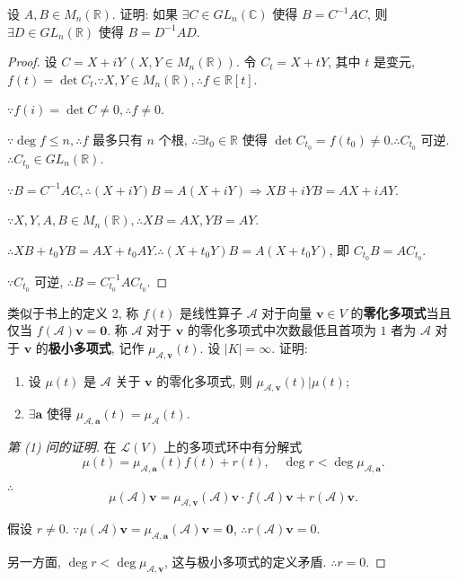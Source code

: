 \documentclass[color=black,device=normal,lang=cn,mode=geye]{elegantnote}
\begin{document}
\begin{exercise}%
    设 $A,B\in M_n(\mathbb{R})$. 证明: 如果 $\exists C\in GL _n(\mathbb{C})$ 使得 $B=C^{-1}AC$, 则 $\exists D\in GL _n(\mathbb{R})$ 使得 $B=D^{-1}AD$.
\end{exercise}
\begin{proof}
    设 $C=X+iY\ (X,Y\in M_n(\mathbb{R}))$. 令 $C_t=X+tY$, 其中 $t$ 是变元, $f(t)=\det C_t.\because X,Y\in M_n(\mathbb{R}),\therefore f\in\mathbb{R}[t]$.
    
    $\because f(i)=\det C\neq0,\therefore f\neq0$.

    $\because\deg f\leq n,\therefore f$ 最多只有 $n$ 个根, $\therefore\exists t_0\in\mathbb{R}$ 使得 $\det C_{t_0}=f(t_0)\neq0.\therefore C_{t_0}$ 可逆. $\therefore C_{t_0}\in GL _n(\mathbb{R})$.

    $\because B=C^{-1}AC,\therefore(X+iY)B=A(X+iY)\Rightarrow XB+iYB=AX+iAY$.

    $\because X,Y,A,B\in M_n(\mathbb{R}),\therefore XB=AX,YB=AY$.

    $\therefore XB+t_0YB=AX+t_0AY.\therefore(X+t_0Y)B=A(X+t_0Y)$, 即 $C_{t_0}B=AC_{t_0}$.

    $\because C_{t_0}$ 可逆, $\therefore B=C_{t_0}^{-1}AC_{t_0}$.
\end{proof}
\begin{exercise}[有修改]\label{ex2.9}
    类似于书上的定义 2, 称 $f(t)$ 是线性算子 $\mathcal{A}$ 对于向量 $\boldsymbol{v}\in V$ 的\textbf{零化多项式}当且仅当 $f(\mathcal{A})\boldsymbol{v}=\boldsymbol{0}$. 称 $\mathcal{A}$ 对于 $\boldsymbol{v}$ 的零化多项式中次数最低且首项为 $1$ 者为 $\mathcal{A}$ 对于 $\boldsymbol{v}$ 的\textbf{极小多项式}, 记作 $\mu_{\mathcal{A},\boldsymbol{v}}(t)$. 设 $|K|=\infty$. 证明:
    \begin{enumerate}
        \def\labelenumi{(\arabic{enumi})}
        \item 设 $\mu(t)$ 是 $\mathcal{A}$ 关于 $\boldsymbol{v}$ 的零化多项式, 则 $\mu_{\mathcal{A},\boldsymbol{v}}(t)|\mu(t)$;
        \item $\exists\boldsymbol{a}$ 使得 $\mu_{\mathcal{A},\boldsymbol{a}}(t)=\mu_{\mathcal{A}}(t)$.
    \end{enumerate}
\end{exercise}
\begin{proof}[第 (1) 问的证明]
    在 $\mathcal{L}(V)$ 上的多项式环中有分解式
    \[\mu(t)=\mu_{\mathcal{A},\boldsymbol{a}}(t)f(t)+r(t),\quad\deg r<\deg\mu_{\mathcal{A},\boldsymbol{a}}.\]

    $\therefore$
    \[\mu(\mathcal{A})\boldsymbol{v}=\mu_{\mathcal{A},\boldsymbol{v}}(\mathcal{A})\boldsymbol{v}\cdot f(\mathcal{A})\boldsymbol{v}+r(\mathcal{A})\boldsymbol{v}.\]

    假设 $r\neq0$. $\because\mu(\mathcal{A})\boldsymbol{v}=\mu_{\mathcal{A},\boldsymbol{a}}(\mathcal{A})\boldsymbol{v}=\boldsymbol{0}$, $\therefore r(\mathcal{A})\boldsymbol{v}=0$.
    
    另一方面, $\deg r<\deg\mu_{\mathcal{A},\boldsymbol{v}}$, 这与极小多项式的定义矛盾. $\therefore r=0$.
\end{proof}
\end{document}
